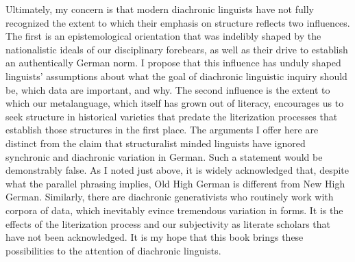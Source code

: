 Ultimately, my concern is that modern diachronic linguists have not fully recognized the extent to which their emphasis on structure reflects two influences. The first is an epistemological orientation that was indelibly shaped by the nationalistic ideals of our disciplinary forebears, as well as their drive to establish an authentically German norm. I propose that this influence has unduly shaped linguists’ assumptions about what the goal of diachronic linguistic inquiry should be, which data are important, and why. The second influence is the extent to which our metalanguage, which itself has grown out of literacy, encourages us to seek structure in historical varieties that predate the literization processes that establish those structures in the first place. The arguments I offer here are distinct from the claim that structuralist minded linguists have ignored synchronic and diachronic variation in German. Such a statement would be demonstrably false. As I noted just above, it is widely acknowledged that, despite what the parallel phrasing implies, Old High German is different from New High German. Similarly, there are diachronic generativists who routinely work with corpora of data, which inevitably evince tremendous variation in forms. It is the effects of the literization process and our subjectivity as literate scholars that have not been acknowledged. It is my hope that this book brings these possibilities to the attention of diachronic linguists. 

